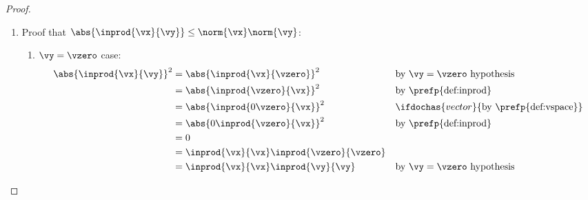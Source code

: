 \begin{proof}
\begin{enumerate}
  \item Proof that $\abs{\inprod{\vx}{\vy}} \le \norm{\vx}\norm{\vy}$:
  \begin{enumerate}
    \item $\vy=\vzero$ case:
      \begin{align*}
         \abs{\inprod{\vx}{\vy}}^2
           &=   \abs{\inprod{\vx}{\vzero}}^2
           &&   \text{by $\vy=\vzero$ hypothesis}
         \\&=   \abs{\inprod{\vzero}{\vx}}^2
           &&   \text{by \prefp{def:inprod}}
         \\&=   \abs{\inprod{0\vzero}{\vx}}^2
           &&   \ifdochas{vector}{\text{by \prefp{def:vspace}}}
         \\&=   \abs{0\inprod{\vzero}{\vx}}^2
           &&   \text{by \prefp{def:inprod}}
         \\&=   0
         \\&=   \inprod{\vx}{\vx}\inprod{\vzero}{\vzero}
         \\&=   \inprod{\vx}{\vx}\inprod{\vy}{\vy}
           &&   \text{by $\vy=\vzero$ hypothesis}
      \end{align*}


\end{enumerate}
\end{enumerate}
\end{proof}
